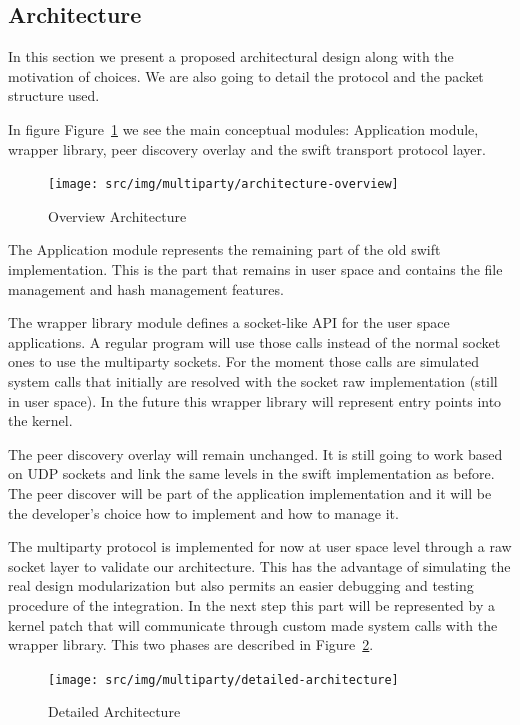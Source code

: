 \subsection{Architecture}

In this section we present a proposed architectural design along with the
motivation of choices. We are also going to detail the protocol and the packet
structure used.

In figure Figure~\ref{fig:multiparty:architecture-overview} we see the main
conceptual modules: Application module, wrapper library, peer discovery
overlay and the swift transport protocol layer.

\begin{figure}
  \centering
  \texttt{[image: src/img/multiparty/architecture-overview]}
  \caption{Overview Architecture}
  \label{fig:multiparty:architecture-overview}
\end{figure}

The Application module represents the remaining part of the old swift
implementation. This is the part that remains in user space and contains the
file management and hash management features. 

The wrapper library module defines a socket-like API for the user space
applications. A regular program will use those calls instead of the normal
socket ones to use the multiparty sockets. For the moment those calls are
simulated system calls that initially are resolved with the socket raw
implementation (still in user space). In the future this wrapper library
will represent entry points into the kernel.

The peer discovery overlay will remain unchanged. It is still going to work
based on UDP sockets and link the same levels in the swift implementation as
before. The peer discover will be part of the application implementation and
it will be the developer's choice how to implement and how to manage it.

The multiparty protocol is implemented for now at user space level through a raw
socket layer to validate our architecture. This has the advantage of
simulating the real design modularization but also permits an easier debugging
and testing procedure of the integration. In the next step this part will be
represented by a kernel patch that will communicate through custom made system
calls with the wrapper library. This two phases are described in
Figure~\ref{fig:multiparty:detailed-architecture}.

\begin{figure}
  \centering
  \texttt{[image: src/img/multiparty/detailed-architecture]}
  \caption{Detailed Architecture}
  \label{fig:multiparty:detailed-architecture}
\end{figure}

